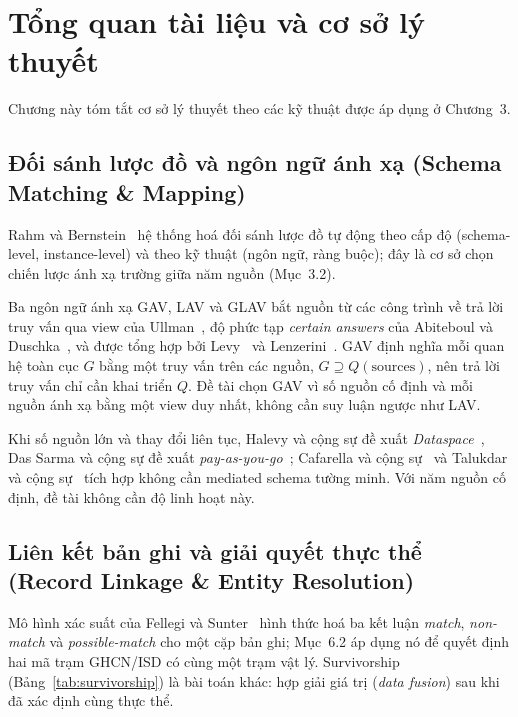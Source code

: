 \documentclass[12pt,a4paper]{report}
\begin{document}
\chapter{Tổng quan tài liệu và cơ sở lý thuyết}

Chương này tóm tắt cơ sở lý thuyết theo các kỹ thuật được áp dụng ở Chương~3.

\section{Đối sánh lược đồ và ngôn ngữ ánh xạ (Schema Matching \& Mapping)}

Rahm và Bernstein~\cite{rahm2001survey} hệ thống hoá đối sánh lược đồ tự động theo cấp độ
(schema-level, instance-level) và theo kỹ thuật (ngôn ngữ, ràng buộc); đây là cơ sở chọn chiến lược ánh
xạ trường giữa năm nguồn (Mục~3.2).

Ba ngôn ngữ ánh xạ GAV, LAV và GLAV bắt nguồn từ các công trình về trả lời truy vấn qua view của
Ullman~\cite{ullman1997logical}, độ phức tạp \emph{certain answers} của Abiteboul và
Duschka~\cite{abiteboul1998complexity}, và được tổng hợp bởi Levy~\cite{levy2001survey} và
Lenzerini~\cite{lenzerini2002theoretical}. GAV định nghĩa mỗi quan hệ toàn cục $G$ bằng một truy vấn trên
các nguồn, $G \supseteq Q(\text{sources})$, nên trả lời truy vấn chỉ cần khai triển $Q$. Đề tài chọn GAV vì
số nguồn cố định và mỗi nguồn ánh xạ bằng một view duy nhất, không cần suy luận ngược như LAV.

Khi số nguồn lớn và thay đổi liên tục, Halevy và cộng sự đề xuất \emph{Dataspace}~\cite{halevy2006dataspace},
Das Sarma và cộng sự đề xuất \emph{pay-as-you-go}~\cite{dassarma2008payasyougo}; Cafarella và cộng
sự~\cite{cafarella2008webtables} và Talukdar và cộng sự~\cite{talukdar2008learning} tích hợp không cần
mediated schema tường minh. Với năm nguồn cố định, đề tài không cần độ linh hoạt này.

\section{Liên kết bản ghi và giải quyết thực thể (Record Linkage \& Entity Resolution)}

Mô hình xác suất của Fellegi và Sunter~\cite{fellegi1969theory} hình thức hoá ba kết luận
\emph{match}, \emph{non-match} và \emph{possible-match} cho một cặp bản ghi; Mục~6.2 áp dụng nó để quyết định hai mã trạm
GHCN/ISD có cùng một trạm vật lý. Survivorship (Bảng~\ref{tab:survivorship}) là bài toán khác: hợp giải giá
trị (\emph{data fusion}) sau khi đã xác định cùng thực thể.
\end{document}
